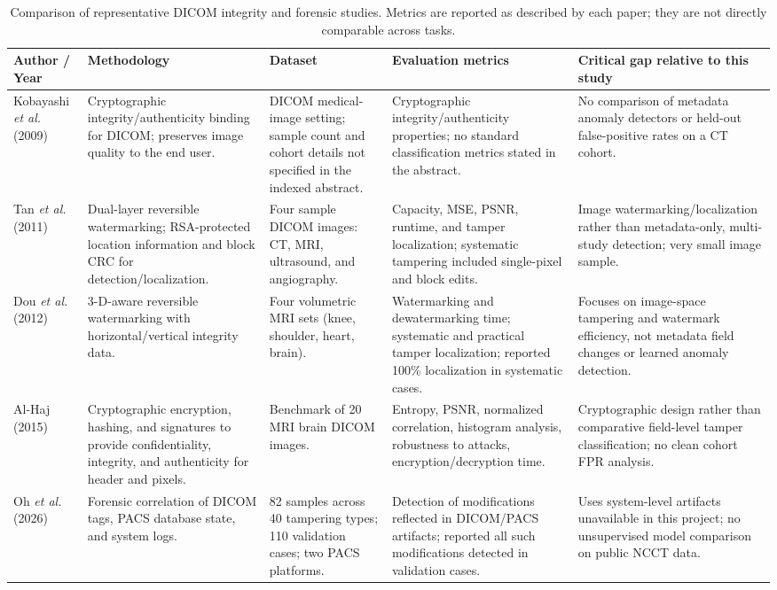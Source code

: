 \documentclass[journal]{IEEEtran}
\begin{document}
  \begin{table}[t]
  \caption{Comparison of representative DICOM integrity and forensic studies. Metrics are reported as described by each paper; they are not directly comparable across tasks.}
  \label{tab:literature}
  \centering\footnotesize
  \begin{tabular}{p{2.7cm}p{4.0cm}p{3.1cm}p{3.5cm}p{4.4cm}}
  \toprule
  \textbf{Author / Year} & \textbf{Methodology} & \textbf{Dataset} & \textbf{Evaluation metrics} & \textbf{Critical gap relative to this study} \\
  \midrule
  Kobayashi \emph{et al.} (2009) \cite{kobayashi2009} & Cryptographic integrity/authenticity binding for DICOM; preserves image quality to the end user. & DICOM medical-image setting; sample count and cohort details not specified in the indexed abstract. & Cryptographic integrity/authenticity properties; no standard classification metrics stated in the abstract. & No comparison of metadata anomaly detectors or held-out false-positive rates on a CT cohort. \\
  Tan \emph{et al.} (2011) \cite{tan2011} & Dual-layer reversible watermarking; RSA-protected location information and block CRC for detection/localization. & Four sample DICOM images: CT, MRI, ultrasound, and angiography. & Capacity, MSE, PSNR, runtime, and tamper localization; systematic tampering included single-pixel and block edits. & Image watermarking/localization rather than metadata-only, multi-study detection; very small image sample. \\
  Dou \emph{et al.} (2012) \cite{dou2012} & 3-D-aware reversible watermarking with horizontal/vertical integrity data. & Four volumetric MRI sets (knee, shoulder, heart, brain). & Watermarking and dewatermarking time; systematic and practical tamper localization; reported 100\% localization in systematic cases. & Focuses on image-space tampering and watermark efficiency, not metadata field changes or learned anomaly detection. \\
  Al-Haj (2015) \cite{alhaj2015} & Cryptographic encryption, hashing, and signatures to provide confidentiality, integrity, and authenticity for header and pixels. & Benchmark of 20 MRI brain DICOM images. & Entropy, PSNR, normalized correlation, histogram analysis, robustness to attacks, encryption/decryption time. & Cryptographic design rather than comparative field-level tamper classification; no clean cohort FPR analysis. \\
  Oh \emph{et al.} (2026) \cite{oh2026} & Forensic correlation of DICOM tags, PACS database state, and system logs. & 82 samples across 40 tampering types; 110 validation cases; two PACS platforms. & Detection of modifications reflected in DICOM/PACS artifacts; reported all such modifications detected in validation cases. & Uses system-level artifacts unavailable in this project; no unsupervised model comparison on public NCCT data. \\
  \bottomrule
  \end{tabular}
  \end{table}
  
\end{document}
